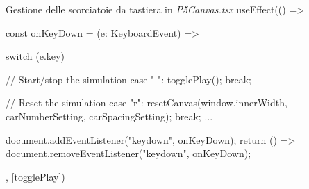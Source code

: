 \begin{tsCode}{Gestione delle scorciatoie da tastiera in \textit{P5Canvas.tsx}}
useEffect(() => {  
  const onKeyDown = (e: KeyboardEvent) => {
     switch (e.key) {
      // Start/stop the simulation
      case " ":
        togglePlay();
        break;

      // Reset the simulation 
      case "r":
        resetCanvas(window.innerWidth, carNumberSetting, carSpacingSetting);
        break;
      ...
    }
  }

  document.addEventListener("keydown", onKeyDown);
  return () => document.removeEventListener("keydown", onKeyDown);
}, [togglePlay])
\end{tsCode}


